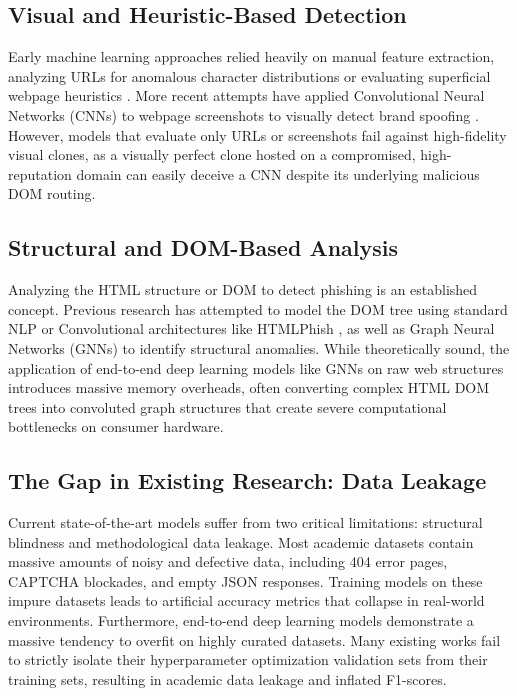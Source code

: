 \documentclass[conference]{IEEEtran}
\begin{document}
\subsection{Visual and Heuristic-Based Detection}
Early machine learning approaches relied heavily on manual feature extraction, analyzing URLs for anomalous character distributions or evaluating superficial webpage heuristics \cite{sahingoz}. More recent attempts have applied Convolutional Neural Networks (CNNs) to webpage screenshots to visually detect brand spoofing \cite{phishpedia}. However, models that evaluate only URLs or screenshots fail against high-fidelity visual clones, as a visually perfect clone hosted on a compromised, high-reputation domain can easily deceive a CNN despite its underlying malicious DOM routing.

\subsection{Structural and DOM-Based Analysis}
Analyzing the HTML structure or DOM to detect phishing is an established concept. Previous research has attempted to model the DOM tree using standard NLP or Convolutional architectures like HTMLPhish \cite{htmlphish}, as well as Graph Neural Networks (GNNs) \cite{zhang} to identify structural anomalies. While theoretically sound, the application of end-to-end deep learning models like GNNs on raw web structures introduces massive memory overheads, often converting complex HTML DOM trees into convoluted graph structures that create severe computational bottlenecks on consumer hardware.

\subsection{The Gap in Existing Research: Data Leakage}
Current state-of-the-art models suffer from two critical limitations: structural blindness and methodological data leakage. Most academic datasets contain massive amounts of noisy and defective data, including 404 error pages, CAPTCHA blockades, and empty JSON responses. Training models on these impure datasets leads to artificial accuracy metrics that collapse in real-world environments. Furthermore, end-to-end deep learning models demonstrate a massive tendency to overfit on highly curated datasets. Many existing works fail to strictly isolate their hyperparameter optimization validation sets from their training sets, resulting in academic data leakage and inflated F1-scores.
\end{document}
